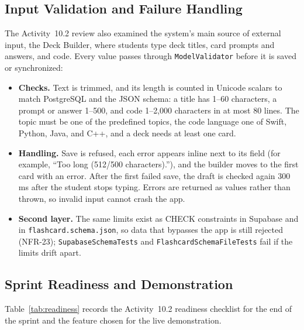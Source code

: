 \documentclass[12pt,letterpaper]{article}
\begin{document}
\subsection{Input Validation and Failure Handling}
The Activity~10.2 review also examined the system's main source of external input,
the Deck Builder, where students type deck titles, card prompts and answers, and code.
Every value passes through \texttt{ModelValidator} before it is saved or synchronized:
\begin{itemize}
  \item \textbf{Checks.} Text is trimmed, and its length is counted in Unicode scalars
        to match PostgreSQL and the JSON schema: a title has 1--60 characters, a
        prompt or answer 1--500, and code 1--2,000 characters in at most 80 lines.
        The topic must be one of the predefined topics, the code language one of
        Swift, Python, Java, and C++, and a deck needs at least one card.
  \item \textbf{Handling.} Save is refused, each error appears inline next to its field
        (for example, ``Too long (512/500 characters).''), and the builder moves to the
        first card with an error. After the first failed save, the draft is checked
        again 300 ms after the student stops typing. Errors are returned as values
        rather than thrown, so invalid input cannot crash the app.
  \item \textbf{Second layer.} The same limits exist as CHECK constraints in Supabase
        and in \texttt{flashcard.schema.json}, so data that bypasses the app is still
        rejected (NFR-23); \texttt{SupabaseSchemaTests} and
        \texttt{FlashcardSchemaFileTests} fail if the limits drift apart.
\end{itemize}

\subsection{Sprint Readiness and Demonstration}
Table~\ref{tab:readiness} records the Activity~10.2 readiness checklist for the end
of the sprint and the feature chosen for the live demonstration.
\end{document}
